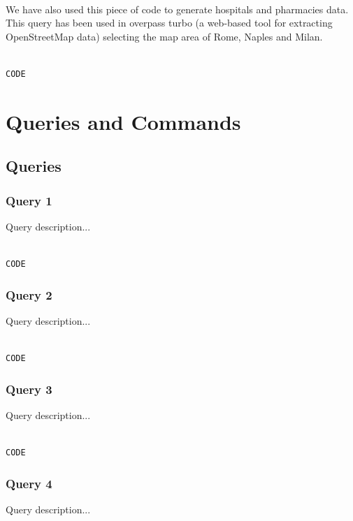 \documentclass{article}
\begin{document}
\\
\hfill\break
We have also used this piece of code to generate hospitals and pharmacies data. This query has been used in overpass turbo (a web-based tool for extracting OpenStreetMap data) selecting the map area of Rome, Naples and Milan.

\begin{lstlisting}[language=cypher, label=lst:cypher-example]

CODE
\end{lstlisting}
\newpage
\section{Queries and Commands}
\subsection{Queries}
\subsubsection{Query 1}
Query description...

\begin{lstlisting}[language=cypher, label=lst:cypher-example]

CODE

\end{lstlisting}
\subsubsection{Query 2}
Query description...

\begin{lstlisting}[language=cypher, label=lst:cypher-example]

CODE

\end{lstlisting}
\subsubsection{Query 3}
Query description...

\begin{lstlisting}[language=cypher, label=lst:cypher-example]

CODE

\end{lstlisting}

\subsubsection{Query 4}
Query description...
\end{document}
